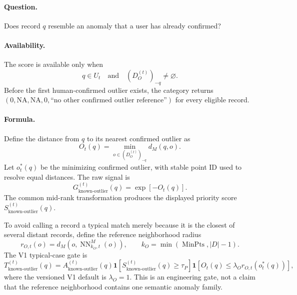 \documentclass[11pt]{article}
\newcommand{\MinPts}{\operatorname{MinPts}}
\newcommand{\NA}{\mathrm{NA}}
\begin{document}
\paragraph{Question.}
Does record $q$ resemble an anomaly that a user has already confirmed?

\paragraph{Availability.}
The score is available only when
\begin{equation}
    q\in U_t
    \quad\text{and}\quad
    (D_O^{(t)})_{-q}\neq\varnothing.
\end{equation}
Before the first human-confirmed outlier exists, the category returns
$(0,\NA,\NA,0,\text{``no other confirmed outlier reference''})$ for every
eligible record.

\paragraph{Formula.}
Define the distance from $q$ to its nearest confirmed outlier as
\begin{equation}
    O_t(q)
    =
    \min_{o\in(D_O^{(t)})_{-q}}d_M(q,o).
\end{equation}
Let $o_t^*(q)$ be the minimizing confirmed outlier, with stable point ID used
to resolve equal distances. The raw signal is
\begin{equation}
    \boxed{
    G_{\mathrm{known\text{-}outlier}}^{(t)}(q)
    =
    \exp[-O_t(q)]
    }.
\end{equation}
The common mid-rank transformation produces the displayed priority score
$S_{\mathrm{known\text{-}outlier}}^{(t)}(q)$.

To avoid calling a record a typical match merely because it is the closest of
several distant records, define the reference neighborhood radius
\begin{equation}
    r_{O,t}(o)
    =
    d_M\!\left(
        o,
        \operatorname{NN}^{M}_{k_O,t}(o)
    \right),
    \qquad
    k_O=\min(\MinPts,|D|-1).
\end{equation}
The V1 typical-case gate is
\begin{equation}
    T_{\mathrm{known\text{-}outlier}}^{(t)}(q)
    =
    A_{\mathrm{known\text{-}outlier}}^{(t)}(q)
    \mathbf{1}\!\left[
        S_{\mathrm{known\text{-}outlier}}^{(t)}(q)\geq\tau_P
    \right]
    \mathbf{1}\!\left[
        O_t(q)\leq\lambda_O r_{O,t}(o_t^*(q))
    \right],
\end{equation}
where the versioned V1 default is $\lambda_O=1$. This is an engineering gate,
not a claim that the reference neighborhood contains one semantic anomaly
family.
\end{document}
